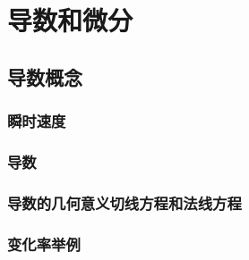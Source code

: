 \chapter{导数和微分}
\section{导数概念}
\subsection{瞬时速度}
\begin{Practice}
  \begin{question}
    \item 
    \item 
  \end{question}
\end{Practice}
\subsection{导数}
\begin{Practice}
  \begin{question}
    \item 
    \item 
    \item 
  \end{question}
\end{Practice}
\subsection{导数的几何意义\texorpdfstring{\quad}{ }切线方程和法线方程}
\begin{Practice}
  \begin{question}
    \item 
    \item 
    \item 
  \end{question}
\end{Practice}
\subsection*{变化率举例}
\begin{Practice}
  \begin{question}
    \item 
    \item 
    \item 
  \end{question}
\end{Practice}
